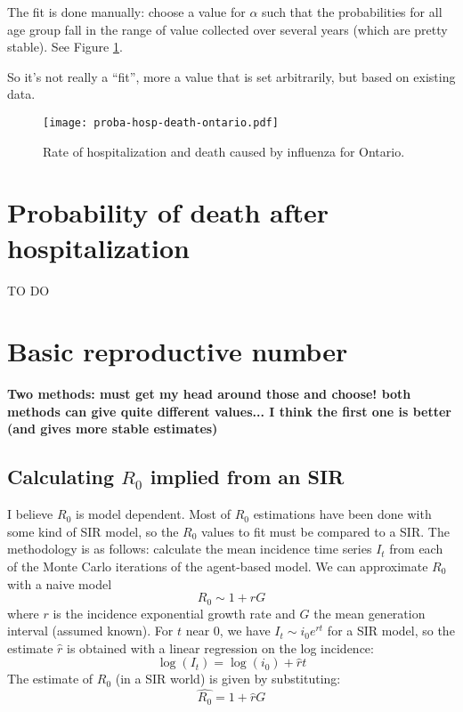 \documentclass[10pt,twocolumn]{article}
\begin{document}
The fit is done manually: choose a value for $\alpha$ such that the probabilities for all age group fall in the range of value collected over several years (which are pretty stable\cite{Schanzer:2013dn}). See Figure \ref{fig:probaHospDeath}.


So it's not really a ``fit'', more a value that is set arbitrarily, but based on existing data.

\begin{figure}[htbp]
   \centering
   \texttt{[image: proba-hosp-death-ontario.pdf]} %
   \caption{Rate of hospitalization and death caused by influenza for Ontario.}
   \label{fig:probaHospDeath}
\end{figure}


\section{Probability of death after hospitalization}


TO DO


\section{Basic reproductive number}


\textbf{Two methods: must get my head around those and choose! both methods can give quite different values... I think the first one is better (and gives more stable estimates)}



\subsection*{Calculating $R_0$ implied from an SIR}
I believe $R_0$ is model dependent. Most of $R_0$ estimations have been done with some kind of SIR model, so the $R_0$ values to fit must be compared to a SIR.
The methodology is as follows: calculate the mean incidence time series $I_{t}$ from each of the Monte Carlo iterations of the agent-based model. 
We can approximate $R_0$ with a naive model
$$R_0 \sim 1 + r G$$
where $r$ is the incidence exponential growth rate and $G$ the mean generation interval (assumed known). For $t$ near 0, we have  $I_{t}\sim i_0 e^{rt}$ for a SIR model, so the estimate $\hat{r}$ is obtained with a linear regression on the log incidence:
$$ \log(I_{t}) = \log(i_0) + \hat{r}t$$
The estimate of $R_{0}$ (in a SIR world) is given by substituting:
$$\hat{R_0} = 1 + \hat{r} G$$
\end{document}
